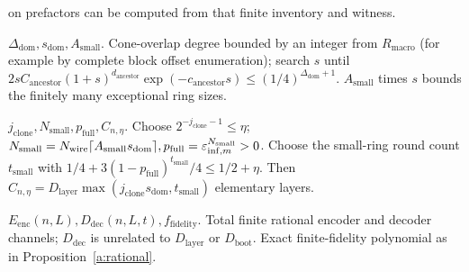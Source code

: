 on prefactors can be computed from that finite inventory and witness.\par\smallskip
\noindent\textbf{\(\Delta_{\mathrm{dom}},s_{\mathrm{dom}},A_{\mathrm{small}}\)}. Cone-overlap degree bounded by an integer from \(R_{\mathrm{macro}}\) (for example by complete block offset enumeration); search \(s\) until \(2s C_{\mathrm{ancestor}}(1+s)^{d_{\mathrm{ancestor}}}\exp (-c_{\mathrm{ancestor}} s)\le (1/4)^{\Delta_{\mathrm{dom}}+1}\). \(A_{\mathrm{small}}\) times \(s\) bounds the finitely many exceptional ring sizes.\par\smallskip
\noindent\textbf{\(j_{\mathrm{clone}},N_{\mathrm{small}},p_{\mathrm{full}},C_{n,\eta}\)}. Choose \(2^{-j_{\mathrm{clone}}-1}\le \eta\); \(N_{\mathrm{small}}=N_{\mathrm{wire}} \lceil A_{\mathrm{small}} s_{\mathrm{dom}}\rceil, p_{\mathrm{full}}=\varepsilon_{\mathrm{inf},m}^{N_{\mathrm{small}}}>0\). Choose the small-ring round count \(t_{\mathrm{small}}\) with \(1/4+3(1-p_{\mathrm{full}})^{t_{\mathrm{small}}}/4\le 1/2+\eta\). Then \(C_{n,\eta}=D_{\mathrm{layer}}\max (j_{\mathrm{clone}} s_{\mathrm{dom}},t_{\mathrm{small}})\) elementary layers.\par\smallskip
\noindent\textbf{\(E_{\mathrm{enc}}(n,L),D_{\mathrm{dec}}(n,L,t),f_{\mathrm{fidelity}}\)}. Total finite rational encoder and decoder channels; \(D_{\mathrm{dec}}\) is unrelated to \(D_{\mathrm{layer}}\) or \(D_{\mathrm{boot}}\). Exact finite-fidelity polynomial as in Proposition~\ref{a:rational}.\par\smallskip

